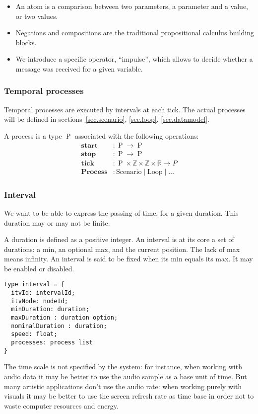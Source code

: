 \documentclass{article}
\DeclareMathOperator{\proc}{P}
\begin{document}
\begin{itemize}
    \item An atom is a comparison between two parameters, a parameter and a value, or two values.
    \item Negations and compositions are the traditional propositional calculus building blocks.
    \item We introduce a specific operator, ``impulse'', which allows to decide whether a message was received for a given variable.
\end{itemize}

\subsubsection{Temporal processes}
Temporal processes are executed by intervals at each tick. 
The actual processes will be defined in sections~\ref{sec.scenario}, \ref{sec.loop}, \ref{sec.datamodel}.

A process is a type $\proc$ associated with the following operations: 
\begin{align*}\label{proc.funs}
\mathbf{start}&: \proc \rightarrow \proc \\
\mathbf{stop}&: \proc \rightarrow \proc \\
\mathbf{tick}&: \proc \times \mathbb{Z} \times \mathbb{Z} \times \mathbb{R} \rightarrow P\\
\mathbf{Process}&: \mathrm{Scenario} \mid \mathrm{Loop} \mid \dots
\end{align*}
\subsubsection{Interval}
We want to be able to express the passing of time, for a given duration.
This duration may or may not be finite.

A duration is defined as a positive integer.
An interval is at its core a set of durations: a min, an optional max, and the current position. 
The lack of max means infinity.
An interval is said to be fixed when its min equals its max. It may be enabled or disabled.

\begin{lstlisting}
type interval = {
  itvId: intervalId;
  itvNode: nodeId;
  minDuration: duration;
  maxDuration : duration option;
  nominalDuration : duration;
  speed: float;
  processes: process list
}
\end{lstlisting}

The time scale is not specified by the system: for instance, when working with audio data it may be better to use the audio sample as a base unit of time.
But many artistic applications don't use the audio rate: when working purely with visuals it may be better to use the screen refresh rate as time base in order not to 
waste computer resources and energy. 
\end{document}
